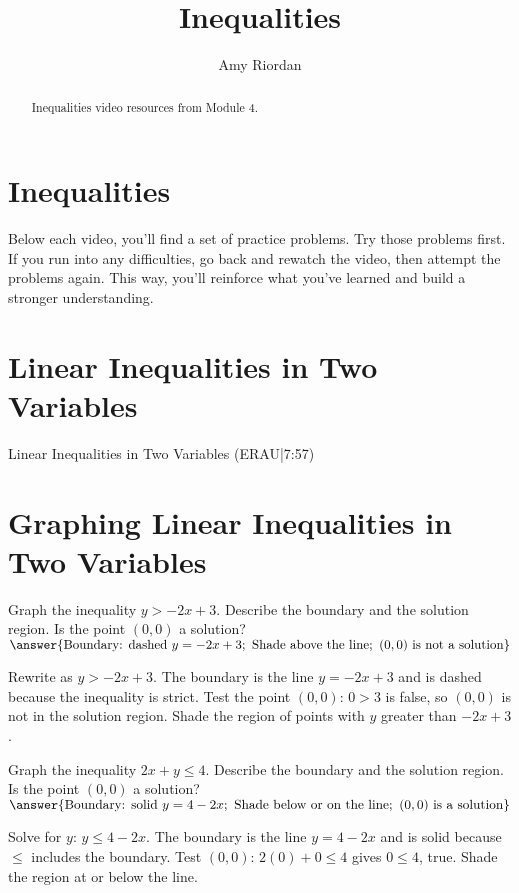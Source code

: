 \documentclass{ximera}
\title{Inequalities}
\author{Amy Riordan}
\begin{document}
\begin{abstract}
Inequalities video resources from Module 4.
\end{abstract}
\maketitle

\section*{Inequalities}

Below each video, you’ll find a set of practice problems. Try those problems first. If you run into any difficulties, go back and rewatch the video, then attempt the problems again. This way, you’ll reinforce what you’ve learned and build a stronger understanding.

\section*{Linear Inequalities in Two Variables}

Linear Inequalities in Two Variables (ERAU|7:57)



\section*{Graphing Linear Inequalities in Two Variables}

\begin{problem}
Graph the inequality \(y > -2x + 3\). Describe the boundary and the solution region. Is the point \((0,0)\) a solution?
$\answer{\text{Boundary: dashed }y=-2x+3;\ \text{Shade above the line};\ (0,0)\ \text{is not a solution}}$
\begin{feedback}
Rewrite as \(y > -2x+3\). The boundary is the line \(y=-2x+3\) and is dashed because the inequality is strict. Test the point \((0,0)\): \(0 > 3\) is false, so \((0,0)\) is not in the solution region. Shade the region of points with \(y\) greater than \(-2x+3\).
\end{feedback}
\end{problem}

\begin{problem}
Graph the inequality \(2x + y \le 4\). Describe the boundary and the solution region. Is the point \((0,0)\) a solution?
$\answer{\text{Boundary: solid }y=4-2x;\ \text{Shade below or on the line};\ (0,0)\ \text{is a solution}}$
\begin{feedback}
Solve for \(y\): \(y \le 4-2x\). The boundary is the line \(y=4-2x\) and is solid because \(\le\) includes the boundary. Test \((0,0)\): \(2(0)+0 \le 4\) gives \(0\le4\), true. Shade the region at or below the line.
\end{feedback}
\end{problem}
\end{document}
